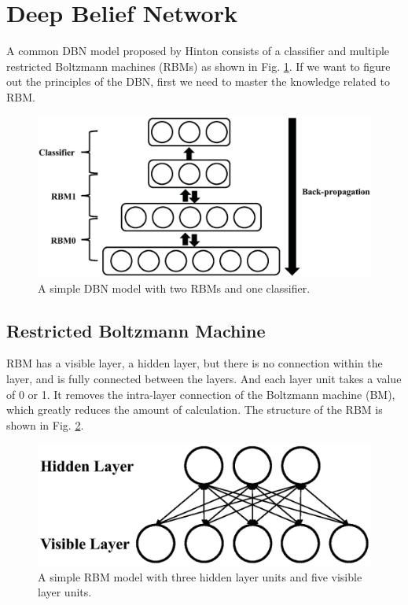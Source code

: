 \documentclass{bioinfo}
\begin{document}
\section{Deep Belief Network}
A common DBN model \cite{hinton2006fast} proposed by Hinton consists of a classifier and multiple restricted Boltzmann machines (RBMs) as shown in Fig. \ref{fig:dbn}. If we want to figure out the principles of the DBN, first we need to master the knowledge related to RBM.

\begin{figure}[htbp]
	\centering
	\includegraphics[width=\columnwidth]{dbn.eps}
	\caption{A simple DBN model with two RBMs and one classifier.}
	\label{fig:dbn}
\end{figure}

\subsection{Restricted Boltzmann Machine}
RBM \cite{hinton1986learning} has a visible layer, a hidden layer, but there is no connection within the layer, and is fully connected between the layers. And each layer unit takes a value of 0 or 1. It removes the intra-layer connection of the Boltzmann machine (BM), which greatly reduces the amount of calculation. The structure of the RBM is shown in Fig. \ref{fig:rbm}.
		
\begin{figure}[htbp]
	\centering
	\includegraphics[width=\columnwidth]{rbm.eps}
	\caption{A simple RBM model with three hidden layer units and five visible layer units.}
	\label{fig:rbm}
\end{figure}
	
\end{document}
